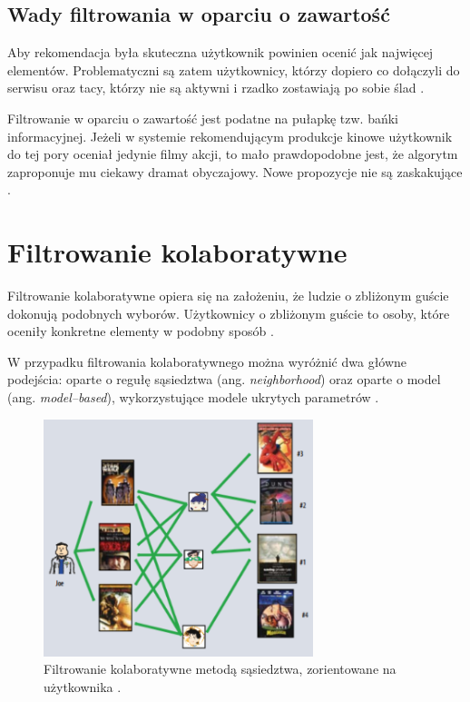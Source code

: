 \documentclass[twoside]{iisthesis}
\begin{document}
	 \subsection{Wady filtrowania w oparciu o zawartość}
	 Aby rekomendacja była skuteczna użytkownik powinien ocenić jak najwięcej elementów. Problematyczni są zatem użytkownicy, którzy dopiero co dołączyli do serwisu oraz tacy, którzy nie są aktywni i rzadko zostawiają po sobie ślad \cite{id:MaleszkaMianowskaNguyenmethod}.
	 
	 Filtrowanie w oparciu o zawartość jest podatne na pułapkę tzw. bańki informacyjnej. Jeżeli w systemie rekomendującym produkcje kinowe użytkownik do tej pory oceniał jedynie filmy akcji, to mało prawdopodobne jest, że algorytm zaproponuje mu ciekawy dramat obyczajowy. Nowe propozycje nie są zaskakujące \cite{id:ContentBasedRecommenderSystemsState}.
	 
	 \section{Filtrowanie kolaboratywne}
	 
	 Filtrowanie kolaboratywne opiera się na założeniu, że ludzie o zbliżonym guście dokonują podobnych wyborów. Użytkownicy o zbliżonym guście to osoby, które oceniły konkretne elementy w podobny sposób \cite{id:IntroductionToRecommenderSystemsHandbook, id:CollaborativeFilteringRecommenderSystems, id:huynh2012modeling}. 
	 
	 W przypadku filtrowania kolaboratywnego można wyróżnić dwa główne podejścia: oparte o regułę sąsiedztwa (ang. \textit{neighborhood}) oraz oparte o model (ang. \textit{model--based}), wykorzystujące modele ukrytych parametrów \cite{id:AdvancesInCollaborativeFiltering,koren2009matrix}. 
	 
	 \begin{figure}[!ht] 
	 	\centering
	 	\includegraphics[width=0.7\textwidth]{cf}
	 	\caption{Filtrowanie kolaboratywne metodą sąsiedztwa,  zorientowane na użytkownika \protect\cite{koren2009matrix}.}
	 	\label{fig:cf}
	 \end{figure}
	 
\end{document}
